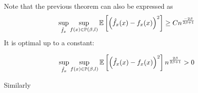 \documentclass{article}
\begin{document}
\begin{remark}
    Note that the previous theorem can also be expressed as \[ 
    \sup_{\hat{f}_x} \sup_{f(x) \in \mathbb{P}(\beta , l)} \mathbb{E} \left[ \left(\hat{f}_{x}(x)-f_{x}(x)\right)^{2}\right] \geq C n^{\frac{-2\beta}{2\beta+1}}
    \]
    It is optimal up to a constant: 


    \[
    \sup_{\hat{f}_x} \sup_{f(x) \in \mathbb{P}(\beta , l)} \mathbb{E} \left[ \left(\hat{f}_{x}(x)-f_{x}(x)\right)^{2}\right] n^{\frac{2\beta}{2\beta+1}} > 0 
    \]
\end{remark}


Similarly
\end{document}
